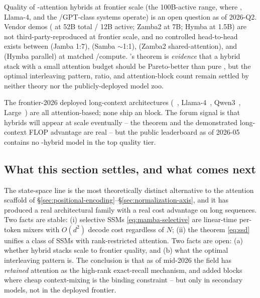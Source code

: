 \begin{contradiction}
\label{con:ssm-frontier-quality}
Quality of -attention hybrids at frontier scale (the 100B-active
range, where , Llama-4, and the /GPT-class systems
operate) is an open question as of 2026-Q2. Vendor demos
(\citealp{lieber2024-jamba} at 52B total / 12B active; Zamba2 at 7B;
Hymba at 1.5B) are not third-party-reproduced at frontier scale, and no
controlled head-to-head exists between (Jamba 1:7), (Samba $\sim$1:1),
(Zamba2 shared-attention), and (Hymba parallel) at matched
/compute. \citet{mamba2}'s  theorem is \emph{evidence} that
a hybrid stack with a small attention budget should be Pareto-better
than pure , but the optimal interleaving pattern, ratio, and
attention-block count remain settled by neither theory nor the
publicly-deployed model zoo.
\end{contradiction}

The frontier-2026 deployed long-context architectures
(~\citep{deepseek-v3}, Llama-4~\citep{meta-llama3},
Qwen3~\citep{qwen3},  Large~\citep{jiang2023}) are all
attention-based; none ship an  block. The forum signal is that
hybrids will appear at scale eventually -- the  theorem and the
demonstrated long-context FLOP advantage are real -- but the public
leaderboard as of 2026-05 contains no -hybrid model in the top
quality tier.

\subsection{What this section settles, and what comes next}
\label{sec:ssm-summary}

The state-space line is the most theoretically distinct alternative to
the attention scaffold of \S\ref{sec:positional-encoding}--\S\ref{sec:normalization-axis},
and it has produced a real architectural family with a real cost
advantage on long sequences. Two facts are stable: (i) selective SSMs
\eqref{eq:mamba-selective} are linear-time per-token mixers with
$O(d^2)$ decode cost regardless of $N$; (ii) the  theorem
\eqref{eq:ssd} unifies a class of SSMs with rank-restricted attention.
Two facts are open: (a) whether hybrid stacks scale to frontier quality,
and (b) what the optimal interleaving pattern is. The
conclusion is that as of mid-2026 the field has \emph{retained}
attention as the high-rank exact-recall mechanism, and added  blocks
where cheap context-mixing is the binding constraint -- but only in
secondary models, not in the deployed frontier.


